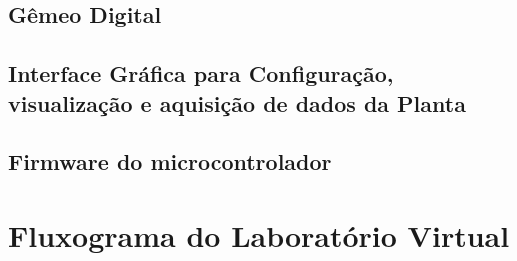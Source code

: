 \subsection{ Gêmeo Digital}


\subsection{Interface Gráfica para Configuração, visualização e aquisição de dados da Planta}
\label{interface_graica}


\subsection{Firmware do microcontrolador}
\label{firmware}



\section{Fluxograma do Laboratório Virtual}
\label{flu_lab_virtual}


